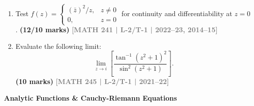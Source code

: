 \documentclass[12pt,a3paper]{article}
\newcommand{\yr}[1]{\hfill\textcolor{gray}{\small\textbf{[#1]}}}
\newcommand{\mk}[1]{\textcolor{orange!70!black}{\small\textbf{(#1 marks)}}}
\newcommand{\subtopic}[2]{%
  \vspace{10pt}
  \noindent\begin{tcolorbox}[colback=#1!8,colframe=#1,boxrule=0.6pt,arc=4pt,
    left=6pt,right=6pt,top=4pt,bottom=4pt]
    \small\bfseries\textcolor{#1}{#2}
  \end{tcolorbox}
  \vspace{2pt}
}
\begin{document}
\begin{enumerate}


\item Test $f(z)=\begin{cases}(\bar{z})^{2}/z, & z\neq 0\\ 0, & z=0\end{cases}$ for continuity and differentiability at $z=0$.
\mk{12/10} \yr{MATH 241 | L-2/T-1 | 2022--23, 2014--15}


\item Evaluate the following limit:
\[
\lim_{z\to i}\left[\frac{\tan^{-1}(z^{2}+1)^{2}}{\sin^{2}(z^{2}+1)}\right].
\]
\mk{10} \yr{MATH 245 | L-2/T-1 | 2021--22}


\end{enumerate}


\subtopic{cE}{Analytic Functions \& Cauchy-Riemann Equations}
\label{sub:s5-analytic}
\end{document}
